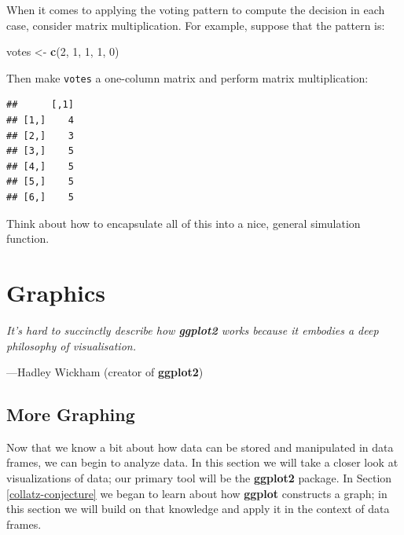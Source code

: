 \documentclass[]{book}
\makeatletter
\newenvironment{Shaded}{\begin{snugshade}}{\end{snugshade}}
\newcommand{\KeywordTok}[1]{\textcolor[rgb]{0.13,0.29,0.53}{\textbf{#1}}}
\newcommand{\DataTypeTok}[1]{\textcolor[rgb]{0.13,0.29,0.53}{#1}}
\newcommand{\DecValTok}[1]{\textcolor[rgb]{0.00,0.00,0.81}{#1}}
\newcommand{\StringTok}[1]{\textcolor[rgb]{0.31,0.60,0.02}{#1}}
\newcommand{\OperatorTok}[1]{\textcolor[rgb]{0.81,0.36,0.00}{\textbf{#1}}}
\newcommand{\NormalTok}[1]{#1}
\newenvironment{kframe}{%
\medskip{}
\setlength{\fboxsep}{.8em}
 \def\at@end@of@kframe{}%
 \ifinner\ifhmode%
  \def\at@end@of@kframe{\end{minipage}}%
  \begin{minipage}{\columnwidth}%
 \fi\fi%
 \def\FrameCommand##1{\hskip\@totalleftmargin \hskip-\fboxsep
 \colorbox{shadecolor}{##1}\hskip-\fboxsep
     \hskip-\linewidth \hskip-\@totalleftmargin \hskip\columnwidth}%
 \MakeFramed {\advance\hsize-\width
   \@totalleftmargin\z@ \linewidth\hsize
   \@setminipage}}%
 {\par\unskip\endMakeFramed%
 \at@end@of@kframe}
\renewenvironment{Shaded}{\begin{kframe}}{\end{kframe}}
\theoremstyle{definition}
\theoremstyle{definition}
\theoremstyle{definition}
\theoremstyle{remark}
\let\BeginKnitrBlock\begin \let\EndKnitrBlock\end
\makeatother
\begin{document}
{\begin{enumerate}
  When it comes to applying the voting pattern to compute the decision
  in each case, consider matrix multiplication. For example, suppose
  that the pattern is:

\begin{Shaded}
\begin{Highlighting}[]
\NormalTok{votes <-}\StringTok{ }\KeywordTok{c}\NormalTok{(}\DecValTok{2}\NormalTok{, }\DecValTok{1}\NormalTok{, }\DecValTok{1}\NormalTok{, }\DecValTok{1}\NormalTok{, }\DecValTok{0}\NormalTok{)}
\end{Highlighting}
\end{Shaded}

  Then make \texttt{votes} a one-column matrix and perform matrix
  multiplication:

\begin{Shaded}
\end{Shaded}

\begin{verbatim}
##      [,1]
## [1,]    4
## [2,]    3
## [3,]    5
## [4,]    5
## [5,]    5
## [6,]    5
\end{verbatim}

  Think about how to encapsulate all of this into a nice, general
  simulation function.
\end{enumerate}

\chapter{Graphics}\label{graphics}

\BeginKnitrBlock{leadquote}
\emph{It's hard to succinctly describe how \textbf{ggplot2} works
because it embodies a deep philosophy of visualisation.}

---Hadley Wickham (creator of \textbf{ggplot2})
\EndKnitrBlock{leadquote}

\section{More Graphing}\label{more-graphing}

Now that we know a bit about how data can be stored and manipulated in
data frames, we can begin to analyze data. In this section we will take
a closer look at visualizations of data; our primary tool will be the
\textbf{ggplot2} package. In Section \ref{collatz-conjecture} we began
to learn about how \textbf{ggplot} constructs a graph; in this section
we will build on that knowledge and apply it in the context of data
frames.

}
\end{document}
